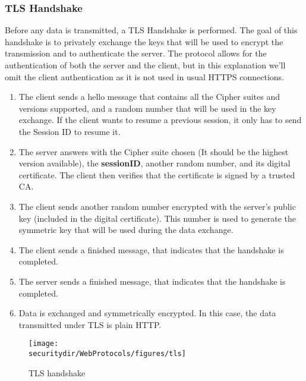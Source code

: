 \subsubsection{TLS Handshake}
Before any data is transmitted, a TLS Handshake is performed. The goal of this handshake is to privately exchange the keys that will be used to encrypt the transmission and to authenticate the server. The protocol allows for the authentication of both the server and the client, but in this explanation we'll omit the client authentication as it is not used in usual HTTPS connections. 
\begin{enumerate}
\item The client sends a hello message that contains all the Cipher suites and versions supported, and a random number that will be used in the key exchange. If the client wants to resume a previous session, it only has to send the Session ID to resume it.

\item The server answers with the Cipher suite chosen (It should be the highest version available), the \textbf{sessionID}, another random number, and its digital certificate. The client then verifies that the certificate is signed by a trusted CA.

\item The client sends another random number encrypted with the server's public key (included in the digital certificate). This number is used to generate the symmetric key that will be used during the data exchange.

\item The client sends a finished message, that indicates that the handshake is completed.

\item The server sends a finished message, that indicates that the handshake is completed.

\item Data is exchanged and symmetrically encrypted. In this case, the data transmitted under TLS is plain HTTP.
\end{enumerate}

\begin{figure}[htb]
	\begin{centering}
		\texttt{[image: \\securitydir/WebProtocols/figures/tls]}
		\par
	\end{centering}
	\caption{\label{fig:tls} TLS handshake}
\end{figure}



